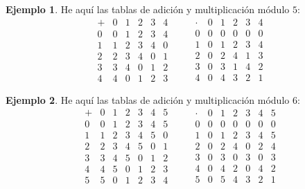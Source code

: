 \documentclass{article}
\theoremstyle{definition}
\newtheorem*{ejemplo}{Ejemplo}
\begin{document}
\begin{ejemplo}
  He aquí las tablas de adición y multiplicación módulo $5$:
  \[
    \begin{array}{c|ccccc}
      + & 0 & 1 & 2 & 3 & 4 \\
      \hline
      0 & 0 & 1 & 2 & 3 & 4 \\
      1 & 1 & 2 & 3 & 4 & 0 \\
      2 & 2 & 3 & 4 & 0 & 1 \\
      3 & 3 & 4 & 0 & 1 & 2 \\
      4 & 4 & 0 & 1 & 2 & 3
    \end{array}
    \quad\quad
    \begin{array}{c|ccccc}
      \cdot & 0 & 1 & 2 & 3 & 4 \\
      \hline
      0 & 0 & 0 & 0 & 0 & 0 \\
      1 & 0 & 1 & 2 & 3 & 4 \\
      2 & 0 & 2 & 4 & 1 & 3 \\
      3 & 0 & 3 & 1 & 4 & 2 \\
      4 & 0 & 4 & 3 & 2 & 1
    \end{array}
  \]
\end{ejemplo}

\begin{ejemplo}
  He aquí las tablas de adición y multiplicación módulo $6$:
  \[
    \begin{array}{c|cccccc}
      + & 0 & 1 & 2 & 3 & 4 & 5 \\
      \hline
      0 & 0 & 1 & 2 & 3 & 4 & 5 \\
      1 & 1 & 2 & 3 & 4 & 5 & 0 \\
      2 & 2 & 3 & 4 & 5 & 0 & 1 \\
      3 & 3 & 4 & 5 & 0 & 1 & 2 \\
      4 & 4 & 5 & 0 & 1 & 2 & 3 \\
      5 & 5 & 0 & 1 & 2 & 3 & 4
    \end{array}
    \quad\quad
    \begin{array}{c|cccccc}
      \cdot & 0 & 1 & 2 & 3 & 4 & 5 \\
      \hline
      0 & 0 & 0 & 0 & 0 & 0 & 0 \\
      1 & 0 & 1 & 2 & 3 & 4 & 5 \\
      2 & 0 & 2 & 4 & 0 & 2 & 4 \\
      3 & 0 & 3 & 0 & 3 & 0 & 3 \\
      4 & 0 & 4 & 2 & 0 & 4 & 2 \\
      5 & 0 & 5 & 4 & 3 & 2 & 1
    \end{array}
  \]
\end{ejemplo}
\end{document}
